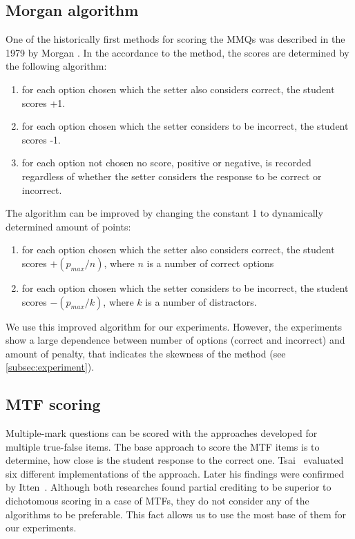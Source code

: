 \subsection{Morgan algorithm}
One of the historically first methods for scoring the MMQs was described in the 1979 by Morgan \cite{Morgan1979}.
In the accordance to the method, the scores are determined by the following algorithm:

\begin{enumerate}
    \item for each option chosen which the setter also considers correct, the student scores +1.
    \item for each option chosen which the setter considers to be incorrect, the student scores -1.
    \item for each option not chosen no score, positive or negative, is recorded regardless of whether the setter considers the response to be correct or incorrect.
\end{enumerate}

The algorithm can be improved by changing the constant 1 to dynamically determined amount of points:

\begin{enumerate}
    \item for each option chosen which the setter also considers correct, the student scores $+(p_{max}/n)$, where $n$ is a number of correct options
    \item for each option chosen which the setter considers to be incorrect, the student scores $-(p_{max}/k)$, where $k$ is a number of distractors.
\end{enumerate}

We use this improved algorithm for our experiments.
However, the experiments show a large dependence between number of options (correct and incorrect) and amount of penalty, that indicates the skewness of the method (see \autoref{subsec:experiment}).

\subsection{MTF scoring}

Multiple-mark questions can be scored with the approaches developed for multiple true-false items.
The base approach to score the MTF items is to determine, how close is the student response to the correct one.
Tsai~\cite{Tsai1993} evaluated six different implementations of the approach.
Later his findings were confirmed by Itten~\cite{Itten1997}.
Although both researches found partial crediting to be superior to dichotomous scoring in a case of MTFs, they do not consider any of the algorithms to be preferable. 
This fact allows us to use the most base of them for our experiments.

